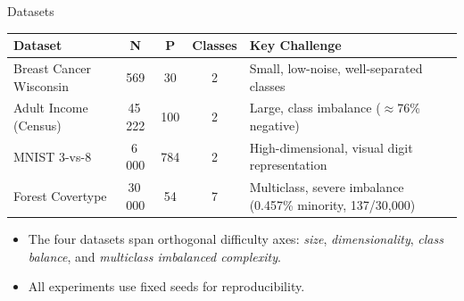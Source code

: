 \documentclass[aspectratio=169,10pt]{beamer}
\begin{document}
\begin{frame}{Datasets}
  \centering\small
  \begin{tabular}{lcccp{5.5cm}}
    \toprule
    \textbf{Dataset} & \textbf{N} & \textbf{P} & \textbf{Classes} & \textbf{Key Challenge} \\
    \midrule
    Breast Cancer Wisconsin & 569     & 30  & 2 & Small, low-noise, well-separated classes \\
    Adult Income (Census)   & 45\,222 & 100 & 2 & Large, class imbalance ($\approx$76\% negative) \\
    MNIST 3-vs-8            & 6\,000  & 784 & 2 & High-dimensional, visual digit representation \\
    Forest Covertype        & 30\,000 & 54  & 7 & Multiclass, severe imbalance (0.457\% minority, 137/30,000) \\
    \bottomrule
  \end{tabular}
  \vspace{6pt}

  \begin{itemize}\small
    \item The four datasets span orthogonal difficulty axes: \emph{size}, \emph{dimensionality}, \emph{class balance}, and \emph{multiclass imbalanced complexity}.
    \item All experiments use fixed seeds for reproducibility.
  \end{itemize}
\end{frame}
\end{document}
